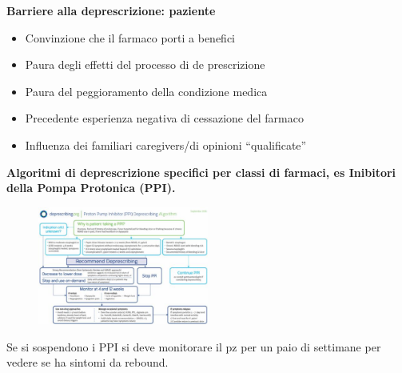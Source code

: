   \textbf{Barriere alla deprescrizione: paziente}

\begin{itemize}
\item
  Convinzione che il farmaco porti a benefici
\item
  Paura degli effetti del processo di de prescrizione
\item
  Paura del peggioramento della condizione medica
\item
  Precedente esperienza negativa di cessazione del farmaco
\item
  Influenza dei familiari caregivers/di opinioni ``qualificate''
\end{itemize}

  \textbf{Algoritmi di deprescrizione specifici per classi di farmaci,
  es Inibitori della Pompa Protonica (PPI).}

  \begin{figure}[!ht]
\centering
	\includegraphics[width=0.5\textwidth]{37/image5.jpg}
	\end{figure}

  Se si sospendono i PPI si deve monitorare il pz per un paio di
  settimane per vedere se ha sintomi da rebound.